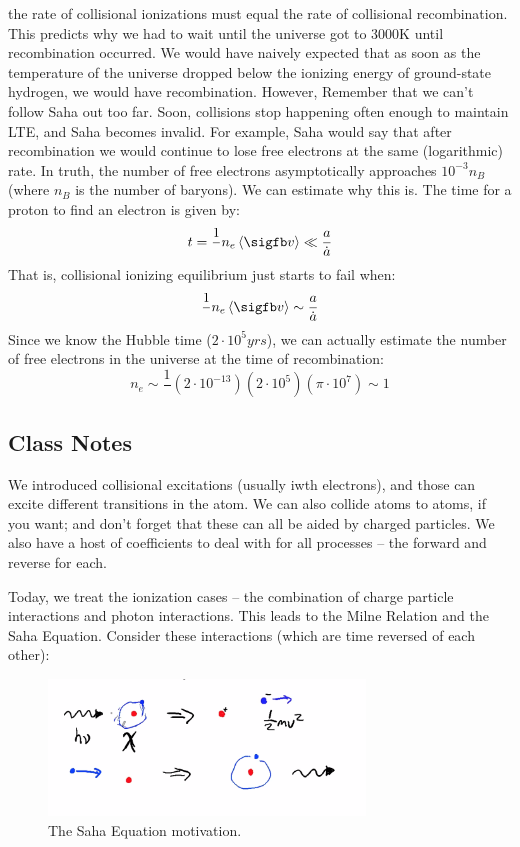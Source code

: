 \documentclass{article}
\def\inv#1{\frac1{#1}}
\def\inv#1{{\frac{1}{}#1}}
\def\mean#1{\left\langle {#1}\right\rangle}
\def\e#1{\cdot10^{#1}}
\begin{document}
the rate of collisional ionizations must equal the rate of collisional 
recombination.  This predicts why we had to wait until the
universe got to 3000K until recombination occurred.  We would have naively 
expected
that as soon as the temperature of the universe dropped below the ionizing 
energy of ground-state hydrogen, we would have recombination.  However, 
Remember that we can't follow Saha out too far.  Soon, collisions stop happening
often enough to maintain LTE, and Saha becomes invalid.  For example, Saha
would say that after recombination we would continue to lose free electrons
at the same (logarithmic) rate.  In truth, the number of free electrons
asymptotically approaches $10^{-3}n_B$ (where $n_B$ is the number of baryons).
We can estimate why this is.  The time for a proton to find an electron is
given by:
$$t=\inv{n_e\mean{\sigfb v}}\ll\frac{a}{ \dot a}$$
That is, collisional ionizing equilibrium just starts to fail when:
$$\inv{n_e\mean{\sigfb v}}\sim\frac{a}{ \dot a}$$
Since we know the Hubble time ($2\e5 yrs$), we can actually estimate
the number of free electrons in the universe at the time of recombination:
$$n_e\sim\inv{(2\e{-13})(2\e5)(\pi\e7)}\sim1$$



\subsection{Class Notes}

We introduced collisional excitations (usually iwth electrons), and those can excite different transitions in the atom. We can also collide atoms to atoms, if you want; and don't forget that these can all be aided by charged particles. We also have a host of coefficients to deal with for all processes -- the forward and reverse for each.

Today, we treat the ionization cases -- the combination of charge particle interactions and photon interactions. This leads to the Milne Relation and the Saha Equation. Consider these interactions (which are time reversed of each other): 

\begin{figure}
    \centering
    \includegraphics[width=0.75\textwidth]{Screen Shot 2020-10-20 at 11.16.37 AM.png}
    \caption{The Saha Equation motivation.}
    \label{fig:saha_mot}
\end{figure}
\end{document}
